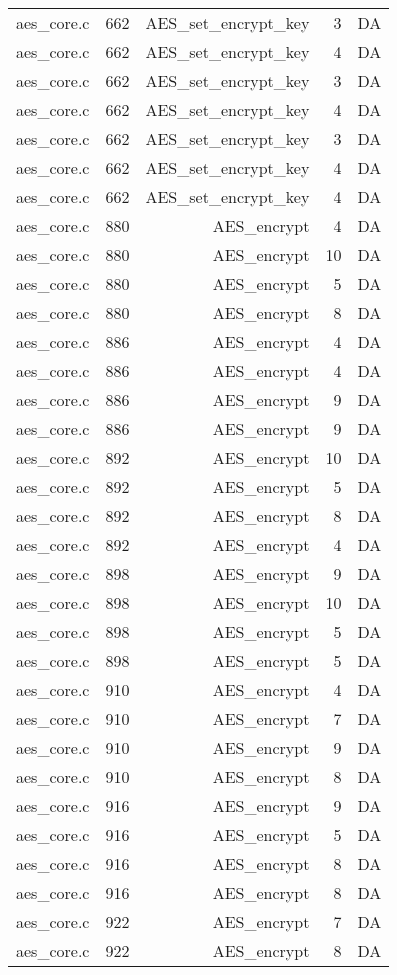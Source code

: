 \begin{table}[h]
{\begin{tabular}{clrrr}
aes\_core.c&662&AES\_set\_encrypt\_key&3 &DA\\
aes\_core.c&662&AES\_set\_encrypt\_key&4 &DA\\
aes\_core.c&662&AES\_set\_encrypt\_key&3 &DA\\
aes\_core.c&662&AES\_set\_encrypt\_key&4 &DA\\
aes\_core.c&662&AES\_set\_encrypt\_key&3 &DA\\
aes\_core.c&662&AES\_set\_encrypt\_key&4 &DA\\
aes\_core.c&662&AES\_set\_encrypt\_key&4 &DA\\
aes\_core.c&880&AES\_encrypt&4 &DA\\
aes\_core.c&880&AES\_encrypt&10&DA\\
aes\_core.c&880&AES\_encrypt&5 &DA\\
aes\_core.c&880&AES\_encrypt&8 &DA\\
aes\_core.c&886&AES\_encrypt&4 &DA\\
aes\_core.c&886&AES\_encrypt&4 &DA\\
aes\_core.c&886&AES\_encrypt&9 &DA\\
aes\_core.c&886&AES\_encrypt&9 &DA\\
aes\_core.c&892&AES\_encrypt&10&DA\\
aes\_core.c&892&AES\_encrypt&5 &DA\\
aes\_core.c&892&AES\_encrypt&8 &DA\\
aes\_core.c&892&AES\_encrypt&4 &DA\\
aes\_core.c&898&AES\_encrypt&9 &DA\\
aes\_core.c&898&AES\_encrypt&10&DA\\
aes\_core.c&898&AES\_encrypt&5 &DA\\
aes\_core.c&898&AES\_encrypt&5 &DA\\
aes\_core.c&910&AES\_encrypt&4 &DA\\
aes\_core.c&910&AES\_encrypt&7 &DA\\
aes\_core.c&910&AES\_encrypt&9 &DA\\
aes\_core.c&910&AES\_encrypt&8 &DA\\
aes\_core.c&916&AES\_encrypt&9 &DA\\
aes\_core.c&916&AES\_encrypt&5 &DA\\
aes\_core.c&916&AES\_encrypt&8 &DA\\
aes\_core.c&916&AES\_encrypt&8 &DA\\
aes\_core.c&922&AES\_encrypt&7 &DA\\
aes\_core.c&922&AES\_encrypt&8 &DA\\

\end{tabular}}
\end{table}
